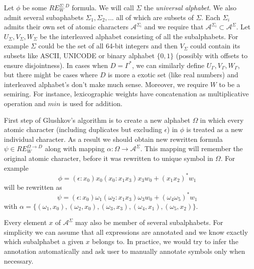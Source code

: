 Let $\phi$ be some $RE_W^{\Sigma:D}$ formula. We will call $\Sigma$ the \textit{universal alphabet}. We also admit several subaphabets $\Sigma_1,\Sigma_2,...$ all of which are subsets of $\Sigma$. Each $\Sigma_i$ admits their own set of atomic characters $\mathcal{A}^{\Sigma_i}$ and we require that $\mathcal{A}^{\Sigma_i}\subset \mathcal{A}^{\Sigma}$.  Let $U_\Sigma,V_\Sigma,W_\Sigma$ be the interleaved alphabet consisting of all the subalphabets. For example $\Sigma$ could be the set of all 64-bit integers and then $V_\Sigma$ could contain its subsets like ASCII, UNICODE or binary alphabet $\{0,1\}$ (possibly with offsets to ensure disjointness). In cases when $D=\Gamma^*$, we can similarly define $U_\Gamma,V_\Gamma,W_\Gamma$, but there might be cases where $D$ is more a exotic set (like real numbers) and interleaved alphabet's don't make much sense. Moreover, we require $W$ to be a semiring. For instance, lexicographic weights have concatenation as multiplicative operation and $min$ is used for addition.

First step of Glushkov's algorithm is to create a new alphabet $\Omega$ in which every atomic character (including duplicates but excluding $\epsilon$) in $\phi$ is treated as a new individual character. As a result we should obtain new rewritten formula 
$\psi \in RE_W^{\Omega \rightarrow D} $ along with mapping $\alpha:\Omega \rightarrow\mathcal{A}^\Sigma$. This mapping will remember the original atomic character, before it was rewritten to unique symbol in $\Omega$.
For example 
\[
\phi=(\epsilon:x_0) x_0(x_0:x_1x_3)x_3 w_0+(x_1x_2)^* w_1
\]
will be rewritten as 
\[
\psi=(\epsilon:x_0) \omega_1(\omega_2:x_1x_3)\omega_3 w_0 + (\omega_4\omega_5)^* w_1
\]
with $\alpha= \{(\omega_1,x_0),(\omega_2,x_0),(\omega_3,x_3),(\omega_4,x_1),(\omega_5,x_2)\}$.

Every element $x$ of $\mathcal{A}^\Sigma$ may also be member of several subalphabets. For simplicity we can assume that all expressions are annotated and we know exactly which subalphabet a given $x$ belongs to. In practice, we would try to infer the annotation automatically and ask user to manually annotate symbols only when necessary.

